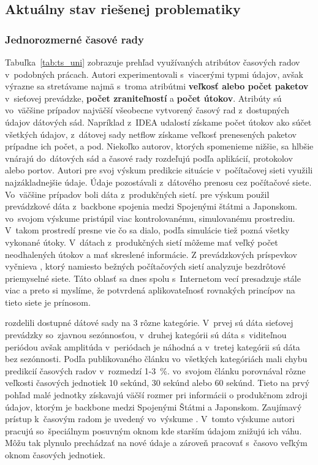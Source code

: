 \documentclass[thesismargins, thesislinespacing, openright, upjsfrontpage]{rnthesis}
\begin{document}
\subsection{Aktuálny stav riešenej problematiky}

\subsubsection{Jednorozmerné časové rady}

Tabuľka~\ref{tab:ts_uni} zobrazuje prehľad využívaných atribútov časových radov v~podobných prácach. Autori experimentovali s~viacerými typmi údajov, avšak výrazne sa stretávame najmä s~troma atribútmi \textbf{veľkosť alebo počet paketov} v~sieťovej prevádzke, \textbf{počet zraniteľností} a \textbf{počet útokov}. Atribúty sú vo~väčšine prípadov najväčší všeobecne vytvorený časový rad z~dostupných údajov dátových sád. Napríklad z~IDEA udalostí získame počet útokov ako súčet všetkých údajov, z~dátovej sady netflow získame veľkosť prenesených paketov prípadne ich počet, a pod. Niekoľko autorov, ktorých spomenieme nižšie, sa hlbšie vnárajú do~dátových sád a časové rady rozdeľujú podľa aplikácií, protokolov alebo portov. 
Autori \cite{jiang2004detecting, wei2012intrusion,madan2018predicting, sang2002predictability,wang2008internet,hasegawa2001applications} pre svoj výskum predikcie situácie v~počítačovej sieti využili najzákladnejšie údaje. Údaje pozostávali z~dátového prenosu cez počítačové siete. Vo~väčšine prípadov boli dáta z~produkčných sietí. \cite{hasegawa2001applications} pre výskum použil prevádzkové dáta z~backbone spojenia medzi Spojenými štátmi a Japonskom. \cite{jiang2004detecting} vo~svojom výskume pristúpil viac kontrolovanému, simulovanému prostrediu. V~takom prostredí presne vie čo sa dialo, podľa simulácie tiež pozná všetky vykonané útoky. V~dátach z~produkčných sietí môžeme mať veľký počet neodhalených útokov a mať skreslené informácie. Z prevádzkových príspevkov vyčnieva \cite{wei2012intrusion}, ktorý namiesto bežných počítačových sietí analyzuje bezdrôtové priemyselné siete. Táto oblasť sa dnes spolu s~Internetom vecí presadzuje stále viac a preto si myslíme, že potvrdená aplikovateľnosť rovnakých princípov na tieto siete je prínosom.

\cite{cortez2012multi} rozdelili dostupné dátové sady na 3 rôzne kategórie. V~prvej sú dáta sieťovej prevádzky so~zjavnou sezónnosťou, v~druhej kategórii sú dáta s~viditeľnou periódou avšak amplitúda v~periódach je náhodná a v~tretej kategórii sú dáta bez sezónnosti. Podľa publikovaného článku vo~všetkých kategóriách mali chybu predikcií časových radov v~rozmedzí 1-3~\%. \cite{hasegawa2001applications} vo~svojom článku porovnával rôzne veľkosti časových jednotiek 10 sekúnd, 30 sekúnd alebo 60 sekúnd. Tieto na prvý pohľad malé jednotky získavajú väčší rozmer pri informácii o produkčnom zdroji údajov, ktorým je backbone medzi Spojenými Štátmi a Japonskom. Zaujímavý prístup k~časovým radom je uvedený vo~výskume \cite{papagiannaki2005long}. V~tomto výskume autori pracujú so~špeciálnym posuvným oknom kde starším údajom znižujú ich váhu. Môžu tak plynulo prechádzať na nové údaje a zároveň pracovať s~časovo veľkým oknom časových jednotiek.
\end{document}
